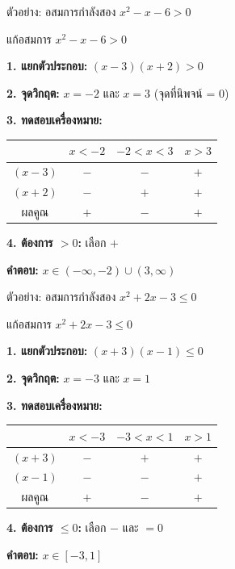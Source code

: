 \documentclass[11pt, aspectratio=169]{beamer}
\begin{document}
\begin{frame}{ตัวอย่าง: อสมการกำลังสอง $x^2 - x - 6 > 0$}
  \begin{exambox}[โจทย์]
    แก้อสมการ $x^2 - x - 6 > 0$
  \end{exambox}

  \begin{solbox}[วิธีทำ]
    \textbf{1. แยกตัวประกอบ:} $(x - 3)(x + 2) > 0$

    \textbf{2. จุดวิกฤต:} $x = -2$ และ $x = 3$ \quad (จุดที่นิพจน์ = 0)

    \textbf{3. ทดสอบเครื่องหมาย:}

    \small
    \begin{tabular}{c|ccc}
                     & $x<-2$ & $-2<x<3$ & $x>3$ \\
      \hline
      $(x-3)$        & $-$    & $-$      & $+$   \\
      $(x+2)$        & $-$    & $+$      & $+$   \\
      \hline
      ผลคูณ          & $+$    & $-$      & $+$
    \end{tabular}
    \normalsize

    \textbf{4. ต้องการ $> 0$:} เลือก $+$

    \textbf{คำตอบ:} $x \in (-\infty, -2) \cup (3, \infty)$
  \end{solbox}
\end{frame}

\begin{frame}{ตัวอย่าง: อสมการกำลังสอง $x^2 + 2x - 3 \leq 0$}
  \begin{exambox}[โจทย์]
    แก้อสมการ $x^2 + 2x - 3 \leq 0$
  \end{exambox}

  \begin{solbox}[วิธีทำ]
    \textbf{1. แยกตัวประกอบ:} $(x + 3)(x - 1) \leq 0$

    \textbf{2. จุดวิกฤต:} $x = -3$ และ $x = 1$

    \textbf{3. ทดสอบเครื่องหมาย:}

    \small
    \begin{tabular}{c|ccc}
                     & $x<-3$ & $-3<x<1$ & $x>1$ \\
      \hline
      $(x+3)$        & $-$    & $+$      & $+$   \\
      $(x-1)$        & $-$    & $-$      & $+$   \\
      \hline
      ผลคูณ          & $+$    & $-$      & $+$
    \end{tabular}
    \normalsize

    \textbf{4. ต้องการ $\leq 0$:} เลือก $-$ และ $= 0$

    \textbf{คำตอบ:} $x \in [-3, 1]$
  \end{solbox}
\end{frame}
\end{document}
